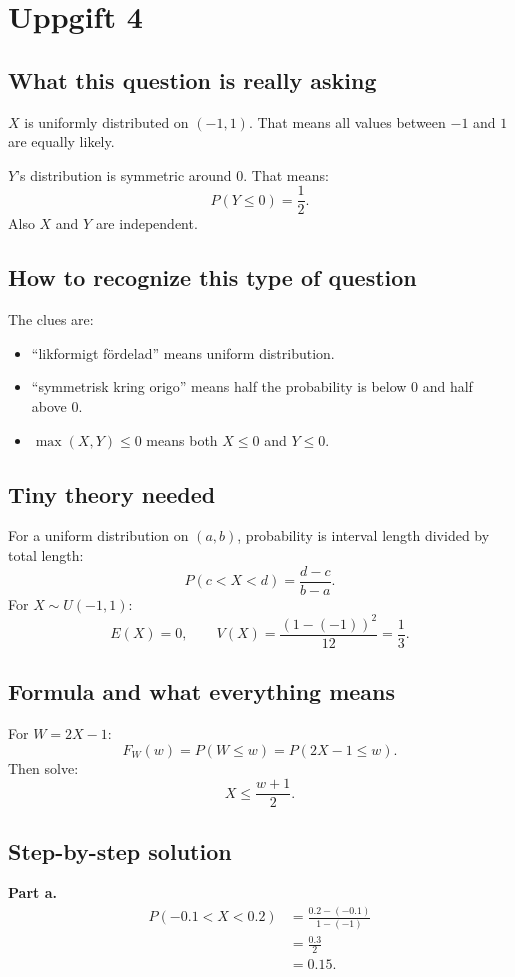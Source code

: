 \documentclass[11pt,a4paper]{article}
\begin{document}
\section*{Uppgift 4}

\subsection*{What this question is really asking}
\(X\) is uniformly distributed on \((-1,1)\). That means all values between \(-1\) and \(1\) are equally likely.

\(Y\)'s distribution is symmetric around 0. That means:
\[
P(Y\le 0)=\frac{1}{2}.
\]
Also \(X\) and \(Y\) are independent.

\subsection*{How to recognize this type of question}
The clues are:
\begin{itemize}[leftmargin=*]
    \item ``likformigt fördelad'' means uniform distribution.
    \item ``symmetrisk kring origo'' means half the probability is below 0 and half above 0.
    \item \(\max(X,Y)\le 0\) means both \(X\le 0\) and \(Y\le 0\).
\end{itemize}

\subsection*{Tiny theory needed}
For a uniform distribution on \((a,b)\), probability is interval length divided by total length:
\[
P(c<X<d)=\frac{d-c}{b-a}.
\]
For \(X\sim U(-1,1)\):
\[
E(X)=0,\qquad V(X)=\frac{(1-(-1))^2}{12}=\frac{1}{3}.
\]

\subsection*{Formula and what everything means}
For \(W=2X-1\):
\[
F_W(w)=P(W\le w)=P(2X-1\le w).
\]
Then solve:
\[
X\le \frac{w+1}{2}.
\]

\subsection*{Step-by-step solution}
\textbf{Part a.}
\begin{align*}
P(-0.1<X<0.2)
&=\frac{0.2-(-0.1)}{1-(-1)}\\
&=\frac{0.3}{2}\\
&=0.15.
\end{align*}
\end{document}
